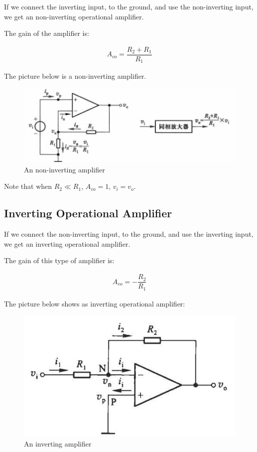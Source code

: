 If we connect the inverting input, to the ground, and use the non-inverting input, we get an non-inverting operational amplifier.

The gain of the amplifier is:

\begin{equation*}
  \begin{aligned}
    A_{vo} = \dfrac{R_2 + R_1}{R_1} 
  \end{aligned}
\end{equation*}

The picture below is a non-inverting amplifier.

\begin{figure}[H]
  \centering
  \includegraphics[width=0.9\linewidth]{figures/non-inverting-amplifier}
  \caption{An non-inverting amplifier}
  \label{fig:}
\end{figure}

Note that when $R_2\ll R_1$, $A_{vo} = 1$, $v_i = v_o$.

\subsection{Inverting Operational Amplifier}

If we connect the non-inverting input, to the ground, and use the inverting input, we get an inverting operational amplifier.

The gain of this type of amplifier is:

\begin{equation*}
  \begin{aligned}
    A_{vo} = - \dfrac{R_2}{R_1} 
  \end{aligned}
\end{equation*}

The picture below shows as inverting operational amplifier:

\begin{figure}[H]
  \centering
  \includegraphics[width=0.4\linewidth]{figures/inverting-amplifier}
  \caption{An inverting amplifier}
  \label{fig:}
\end{figure}


